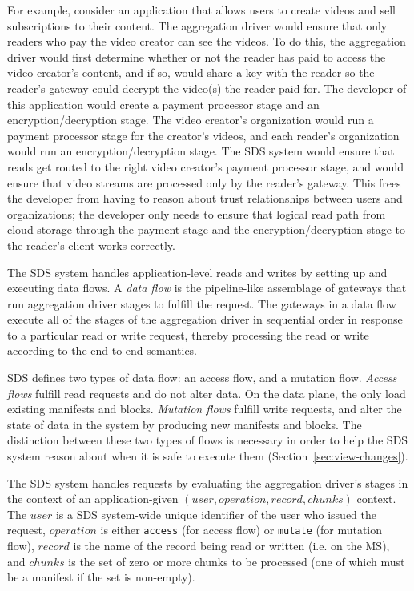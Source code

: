 \begin{itemize}
      For example, consider an application that allows users to
      create videos and sell subscriptions to their content.  The aggregation
      driver would ensure that only readers who pay the video creator can see
      the videos.  To do this, the aggregation driver would first determine whether or not the
      reader has paid to access the video creator's content, and if so, would
      share a key with the reader so the reader's gateway could decrypt the
      video(s) the reader paid for.  The developer of this application would
      create a payment processor stage and an
      encryption/decryption stage.  The video creator's organization would run a
      payment processor stage for the creator's videos, and each reader's
      organization would run an encryption/decryption stage.  The SDS system
      would ensure that reads get routed to the right video creator's payment
      processor stage, and would ensure that video streams are processed only by
      the reader's gateway.  This frees the developer from having to reason
      about trust relationships between users and organizations; the developer
      only needs to ensure that logical read path from cloud storage through the payment
      stage and the encryption/decryption stage to the reader's client works
      correctly.
\end{itemize}

The SDS system handles application-level reads and writes by setting up and
executing data flows.  A \emph{data flow} is the pipeline-like assemblage of gateways
that run aggregation driver stages to fulfill the request.  The gateways in a data flow execute all
of the stages of the aggregation driver in sequential order in response to a
particular read or write request, thereby processing the
read or write according to the end-to-end semantics.

SDS defines two types of data flow:  an access flow, and a mutation flow.
\emph{Access flows} fulfill read requests and do not alter data.  On the data
plane, the only load existing manifests and blocks.
\emph{Mutation flows} fulfill write requests, and alter
the state of data in the system by producing new manifests and blocks.
The distinction between these two types of flows is necessary in order to help
the SDS system reason about when it is safe to execute them 
(Section~\ref{sec:view-changes}).

The SDS system handles requests by evaluating the aggregation driver's stages in the context of
an application-given $(user, operation, record, chunks)$ context.  The
$user$ is a SDS system-wide unique identifier of the user who issued the request,
$operation$ is either \texttt{access} (for access flow) or \texttt{mutate} (for
mutation flow), $record$ is the name of the record being read or written (i.e. on
the MS), and $chunks$ is the set of zero or more chunks to be processed (one of which must be
a manifest if the set is non-empty).

